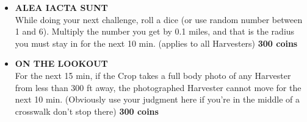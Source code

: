 \documentclass{article}
\begin{document}
\begin{itemize}
    \item \textbf{ALEA IACTA SUNT} \\ While doing your next challenge, roll a dice (or use random number between 1 and 6). Multiply the number you get by 0.1 miles, and that is the radius you must stay in for the next 10 min. (applies to all Harvesters) \textbf{300 coins}
    \item \textbf{ON THE LOOKOUT} \\ For the next 15 min, if the Crop takes a full body photo of any Harvester from less than 300 ft away, the photographed Harvester cannot move for the next 10 min. (Obviously use your judgment here if you're in the middle of a crosswalk don't stop there) \textbf{300 coins}
\end{itemize}
\end{document}
